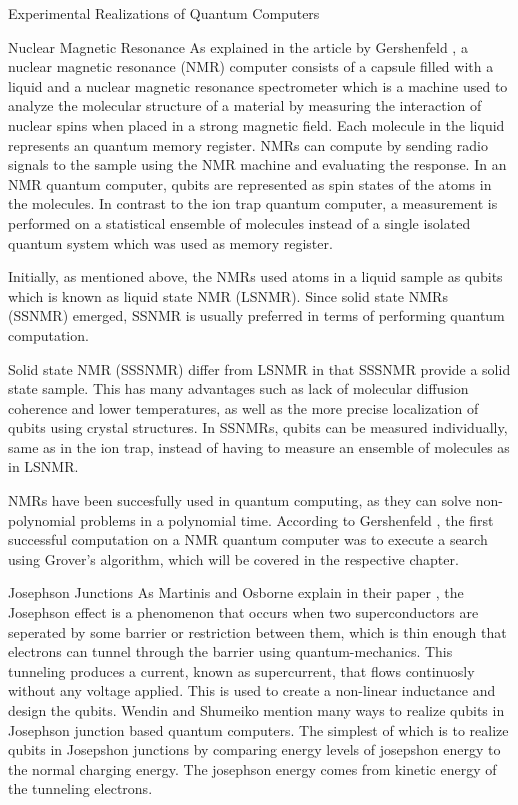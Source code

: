 \documentclass[aps,preprintnumbers,twocolumn]{revtex4}
\begin{document}
\begin{section}{Experimental Realizations of Quantum Computers}
\begin{subsection}{Nuclear Magnetic Resonance}
As explained in the article by Gershenfeld \cite[p.66-71]{Gershenfeld1998QuantumCW}, a nuclear magnetic resonance (NMR) computer consists of a capsule filled with a liquid and a nuclear magnetic resonance spectrometer which is a machine used to analyze the molecular structure of a material by measuring the interaction of nuclear spins when placed in a strong magnetic field.
Each molecule in the liquid represents an quantum memory register. 
NMRs can compute by sending radio signals to the sample using the NMR machine and evaluating the response. 
In an NMR quantum computer, qubits are represented as spin states of the atoms in the molecules. 
In contrast to the ion trap quantum computer, 
a measurement is performed on a statistical ensemble of molecules instead of a single isolated quantum system which was used as memory register. 

Initially, as mentioned above, the NMRs used atoms in a liquid sample as qubits which is known as liquid state NMR (LSNMR). 
Since solid state NMRs (SSNMR) emerged, SSNMR is usually preferred in terms of performing quantum computation.

Solid state NMR (SSSNMR) differ from LSNMR in that SSSNMR provide a solid state sample.
This has many advantages such as lack of molecular diffusion coherence and lower temperatures, as well as the more precise localization of qubits using crystal structures.
In SSNMRs, qubits can be measured individually, same as in the ion trap,
instead of having to measure an ensemble of molecules as in LSNMR. 

NMRs have been succesfully used in quantum computing, as they can solve non-polynomial problems in a polynomial time.
According to Gershenfeld \cite[p.69]{Gershenfeld1998QuantumCW}, the first successful computation on a NMR quantum computer was to execute a search using Grover's algorithm, 
which will be covered in the respective chapter. 
\end{subsection}

\begin{subsection}{Josephson Junctions}
As Martinis and Osborne explain in their paper \cite[p.3-6]{martinis}, 
the Josephson effect is a phenomenon that occurs when two superconductors are seperated 
by some barrier or restriction between them, which is thin enough that electrons can tunnel through the barrier using quantum-mechanics. 
This tunneling produces a current, known as supercurrent, that flows continuosly without any voltage applied. 
This is used to create a non-linear inductance and design the qubits. 
Wendin and Shumeiko mention \cite[p.727]{shumeiko} many ways to realize qubits in Josephson junction based quantum computers. 
The simplest of which is to realize qubits in Josepshon junctions by comparing energy levels of josepshon energy to the normal charging energy. 
The josephson energy comes from kinetic energy of the tunneling electrons.


\end{subsection}
\end{section}
\end{document}
